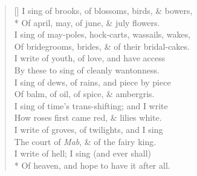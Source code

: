 \documentclass[MAIN]{subfiles}
\begin{document}
\settowidth{\versewidth}{Of bridegrooms, brides, \& of their bridal-cakes.}
\begin{verse}[\versewidth]
I sing of brooks, of blossoms, birds, \& bowers,\\* 
Of april, may, of june, \& july flowers.\\
I sing of may-poles, hock-carts, wassails, wakes,\\
Of bridegrooms, brides, \& of their bridal-cakes.\\
I write of youth, of love, and have access\\
By these to sing of cleanly wantonness.\\
I sing of dews, of rains, and piece by piece\\
Of balm, of oil, of spice, \& ambergris.\\
I sing of time's trans-shifting; and I write\\
How roses first came red, \& lilies white.\\
I write of groves, of twilights, and I sing\\
The court of \emph{Mab}, \& of the fairy king.\\ 
I write of hell; I sing (and ever shall)\\* 
Of heaven, and hope to have it after all.
\end{verse}
\end{document}

